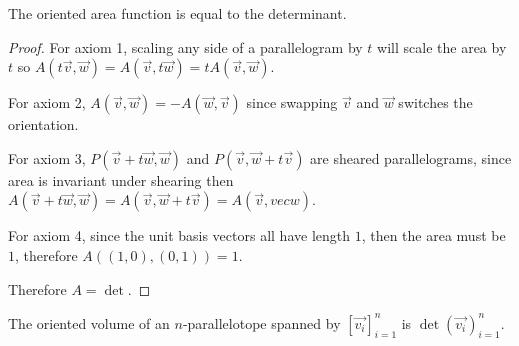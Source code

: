 \documentclass[notes]{subfiles}
\begin{document}
\begin{lemma}
    The oriented area function is equal to the determinant.
\end{lemma}
\begin{proof}
    For axiom 1, scaling any side of a parallelogram by $t$ will scale the area by $t$ so $A(t\vec{v}, \vec{w}) = A(\vec{v}, t\vec{w}) = tA(\vec{v}, \vec{w})$.

    For axiom 2, $A(\vec{v}, \vec{w}) = -A(\vec{w}, \vec{v})$ since swapping $\vec{v}$ and $\vec{w}$ switches the orientation.

    For axiom 3, $P(\vec{v} + t\vec{w}, \vec{w})$ and $P(\vec{v}, \vec{w} + t\vec{v})$ are sheared parallelograms, since area is invariant under shearing then $A(\vec{v} + t\vec{w}, \vec{w}) = A(\vec{v}, \vec{w} + t\vec{v}) = A(\vec{v},vec{w})$.

    For axiom 4, since the unit basis vectors all have length $1$, then the area must be $1$, therefore $A((1, 0), (0, 1)) = 1$.

    Therefore $A = \det$.
\end{proof}

\begin{theorem}
    The oriented volume of an $n$-parallelotope spanned by $[\vec{v_i}]_{i = 1}^n$ is $\det(\vec{v_i})_{i = 1}^n$.
\end{theorem}
\end{document}
